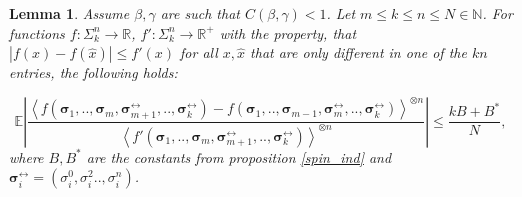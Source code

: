 \documentclass[a4paper,12pt,oneside,reqno]{amsart}
\numberwithin{equation}{section}
\newtheorem{lem}[teor]{Lemma}
\begin{document}
\begin{lem}\label{swap_one}
Assume ${\beta},\gamma$ are such that $C({\beta},\gamma)<1$. Let $m \leq k \leq n \leq N \in{\mathbb{N}}$. For functions $f:\Sigma_k^n \rightarrow {\mathbb{R}}$, $f':\Sigma_k^n \rightarrow {\mathbb{R}}^+$ with the property, that $|f(x)-f(\hat x)| \leq f'(x)$ for all $x,\hat x$ that are only different in one of the $k n$ entries, the following holds:

\begin{equation}\label{exchange} {{\mathbb{E}}}\left|\frac{\left<f \left(\boldsymbol{\sigma}_1,..,\boldsymbol{\sigma}_m,\boldsymbol{\sigma}^{\leftrightarrow}_{m+1},..,\boldsymbol{\sigma}^{\leftrightarrow}_{k}\right)-f\left(\boldsymbol{\sigma}_1,..,\boldsymbol{\sigma}_{m-1},\boldsymbol{\sigma}^{\leftrightarrow}_{m},..,\boldsymbol{\sigma}^{\leftrightarrow}_{k} \right)\right>^{\otimes n}}{\left<f'\left(\boldsymbol{\sigma}_1,..,\boldsymbol{\sigma}_m,\boldsymbol{\sigma}^{\leftrightarrow}_{m+1},..,\boldsymbol{\sigma}^{\leftrightarrow}_{k} \right)\right>^{\otimes n}} \right| \leq \frac{kB+B^*}{N},\end{equation}
where $B,B^*$ are the constants from proposition \ref{spin_ind} and $\boldsymbol{\sigma}^{\leftrightarrow}_i =\left(\sigma_i^0,\sigma_i^2..,\sigma_i^n\right)$.
\end{lem}
\end{document}
